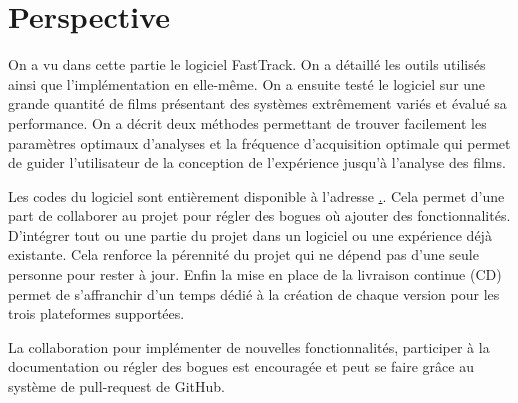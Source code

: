 \chapter{Perspective}

	On a vu dans cette partie le logiciel FastTrack. On a détaillé les outils utilisés ainsi que l'implémentation en elle-même. On a ensuite testé le logiciel sur une grande quantité de films présentant des systèmes extrêmement variés et évalué sa performance. On a décrit deux méthodes permettant de trouver facilement les paramètres optimaux d'analyses et la fréquence d'acquisition optimale qui permet de guider l'utilisateur de la conception de l'expérience jusqu'à l'analyse des films.

	
	Les codes du logiciel sont entièrement disponible à l'adresse \url{.}. Cela permet d'une part de collaborer au projet pour régler des bogues où ajouter des fonctionnalités. D'intégrer tout ou une partie du projet dans un logiciel ou une expérience déjà existante. Cela renforce la pérennité du projet qui ne dépend pas d'une seule personne pour rester à jour. Enfin la mise en place de la livraison continue (CD) permet de s'affranchir d'un temps dédié à la création de chaque version pour les trois plateformes supportées.

	
	La collaboration pour implémenter de nouvelles fonctionnalités, participer à la documentation ou régler des bogues est encouragée et peut se faire grâce au système de pull-request de GitHub.
	
	

